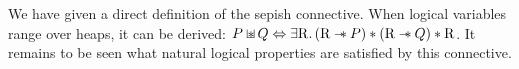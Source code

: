 \documentclass{article}
\begin{document}
%
%
We have given a direct definition of the sepish connective. When logical variables range over heaps, it  can be derived: $P \mathbin{\sqcup\mkern-10mu*} Q \Leftrightarrow \exists {\ensuremath{\mathrm{R}}} \mathpunct{.} ({\mathrm{R}} \mathbin{-\mkern-6mu *} P) \mathbin{*} ({\mathrm{R}} \mathbin{-\mkern-6mu *} Q) \mathbin{*} {\mathrm{R}}$. It remains to be seen what
natural  logical properties are satisfied by this connective. 



%
%




% 
% 



\end{document}
